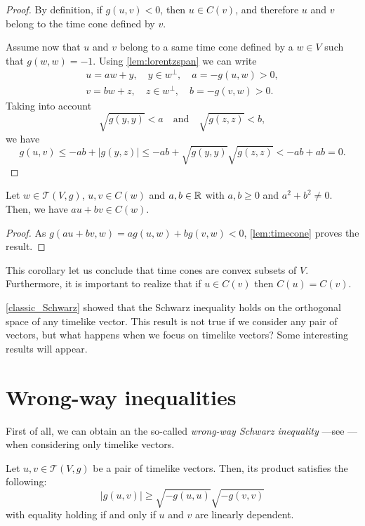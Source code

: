 \begin{proof}
    By definition, if $g(u,v)<0$, then $u\in C(v)$, and therefore $u$ and $v$ belong to the time cone defined by $v$.
    
    Assume now that $u$ and $v$ belong to a same time cone defined by a $w \in V$ such that $g(w,w) = -1$. Using \autoref{lem:lorentzspan} we can write
    \begin{align*}
        u=aw+y, \quad y\in w^{\perp}, \quad a=-g(u,w)>0,\\
        v=bw+z, \quad z\in w^{\perp}, \quad b=-g(v,w)>0.
    \end{align*}
    Taking into account
    \[
	    \sqrt{g(y,y)}<a \quad \mathrm{and} \quad \sqrt{g(z,z)}<b,
    \]
    we have
    \[
	    g(u,v)\leq -ab+ \lvert g(y,z) \rvert \leq -ab + \sqrt{g(y,y)}\sqrt{g(z,z)}<-ab+ab=0.
    \]
\end{proof}

\begin{corollary}\label{convexity}
Let $w\in\mathcal{T}(V,g)$, $u,v\in C(w)$ and $a,b\in \mathbb{R}$ with $a,b\geq 0$ and $a^2+b^2 \neq 0$. Then, we have $au+bv\in C(w)$.
\end{corollary}

\begin{proof}
    As $g(au+bv,w)=a g(u,w)+ b g(v,w)<0$, \autoref{lem:timecone} proves the result.
\end{proof}

This corollary let us conclude that time cones are convex subsets of $V$. Furthermore, it is important to realize that if $u\in C(v)$ then $C(u)=C(v)$.

\autoref{classic_Schwarz} showed that the Schwarz inequality holds on the orthogonal space of any timelike vector. This result is not true if we consider any pair of vectors, but what happens when we focus on timelike vectors? Some interesting results will appear.

\section{Wrong-way inequalities}

First of all, we can obtain an the so-called \emph{wrong-way Schwarz inequality} ---see \cite[Prop. 5.30]{oneill83}--- when considering only timelike vectors.

\begin{proposition}
	\label{pro:wrongway}
    Let $u,v \in \mathcal{T}(V,g)$ be a pair of timelike vectors. Then, its product satisfies the following:
    \[
        \lvert g(u,v) \vert \geq \sqrt{-g(u,u)}\sqrt{-g(v,v)}
    \]
    with equality holding if and only if $u$ and $v$ are linearly dependent.
\end{proposition}

